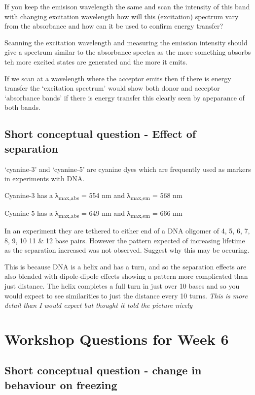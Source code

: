 \documentclass[
]{book}
\begin{document}
If you keep the emisison wavelength the same and scan the intensity of this band with changing excitation wavelength how will this (excitation) spectrum vary from the absorbance and how can it be used to confirm energy transfer?

Scanning the excitation wavelength and measuring the emission intensity should give a spectrum similar to the absorbance spectra as the more something absorbs teh more excited states are generated and the more it emits.

If we scan at a wavelength where the acceptor emits then if there is energy transfer the `excitation spectrum' would show both donor and acceptor `absorbance bands' if there is energy transfer this clearly seen by apeparance of both bands.

\hypertarget{sec:FRETDNA}{%
\section{Short conceptual question - Effect of separation}\label{sec:FRETDNA}}

`cyanine-3' and `cyanine-5' are cyanine dyes which are frequently used as markers in experiments with DNA.

Cyanine-3 has a λ\textsubscript{max,abs} = 554 nm and λ\textsubscript{max,em} = 568 nm

Cyanine-5 has a λ\textsubscript{max,abs} = 649 nm and λ\textsubscript{max,em} = 666 nm

In an experiment they are tethered to either end of a DNA oligomer of 4, 5, 6, 7, 8, 9, 10 11 \& 12 base pairs. However the pattern expected of increasing lifetime as the separation increased was not observed. Suggest why this may be occuring.

This is because DNA is a helix and has a turn, and so the separation effects are also blended with dipole-dipole effects showing a pattern more complicated than just distance. The helix completes a full turn in just over 10 bases and so you would expect to see similarities to just the distance every 10 turns. \emph{This is more detail than I would expect but thought it told the picture nicely}

\hypertarget{ch:Workshop6}{%
\chapter{Workshop Questions for Week 6}\label{ch:Workshop6}}

\hypertarget{short-conceptual-question---change-in-behaviour-on-freezing}{%
\section{Short conceptual question - change in behaviour on freezing}\label{short-conceptual-question---change-in-behaviour-on-freezing}}
\end{document}

